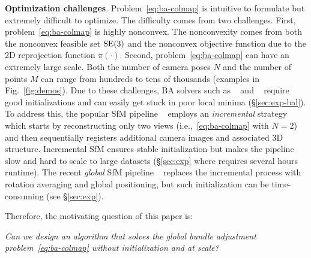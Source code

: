 \textbf{Optimization challenges}. Problem~\eqref{eq:ba-colmap} is intuitive to formulate but extremely difficult to optimize. The difficulty comes from two challenges. First, problem~\eqref{eq:ba-colmap} is highly nonconvex. The nonconvexity comes from both the nonconvex feasible set $\mathrm{SE}(3)$ and the nonconvex objective function due to the 2D reprojection function $\pi(\cdot)$. Second, problem~\eqref{eq:ba-colmap} can have an extremely large scale. Both the number of camera poses $N$ and the number of points $M$ can range from hundreds to tens of thousands (\cf examples in Fig.~\ref{fig:demos}). Due to these challenges, BA solvers such as \ceres~\cite{agarwal2012ceres} and \gtsam~\cite{dellaert2022gtsam} require good initializations and can easily get stuck in poor local minima (\cf \S\ref{sec:exp-bal}). To address this, the popular SfM pipeline \colmap~\cite{schoenberger2016sfm} employs an \emph{incremental} strategy which starts by reconstructing only two views (i.e.,~\eqref{eq:ba-colmap} with $N=2$) and then sequentially registers additional camera images and associated 3D structure. Incremental SfM ensures stable initialization but makes the pipeline slow and hard to scale to large datasets (\cf \S\ref{sec:exp} where \colmap requires several hours runtime). The recent \emph{global} SfM pipeline \glomap~\cite{pan2025global} replaces the incremental process with rotation averaging and global positioning, but such initialization can be time-consuming (see \S\ref{sec:exp}).

Therefore, the motivating question of this paper is:

\emph{Can we design an algorithm that solves the global bundle adjustment problem~\eqref{eq:ba-colmap} without initialization and at scale?}




